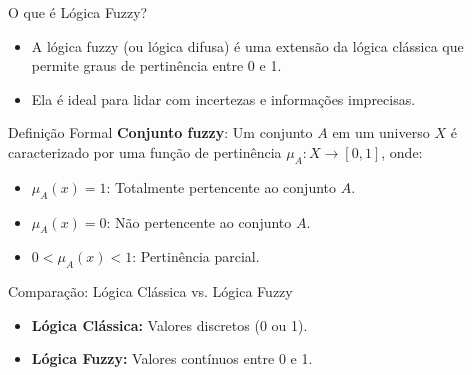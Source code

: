 \documentclass{beamer}
\begin{document}
\begin{frame}{O que é Lógica Fuzzy?}
    \begin{itemize}
        \item A lógica fuzzy (ou lógica difusa) é uma extensão da lógica clássica que permite graus de pertinência entre 0 e 1.
        \item Ela é ideal para lidar com incertezas e informações imprecisas.
    \end{itemize}
    \pause
    \begin{block}{Definição Formal}
        \textbf{Conjunto fuzzy}: Um conjunto \( A \) em um universo \( X \) é caracterizado por uma função de pertinência \( \mu_A: X \to [0, 1] \), onde:
        \begin{itemize}
            \item \( \mu_A(x) = 1 \): Totalmente pertencente ao conjunto \( A \).
            \item \( \mu_A(x) = 0 \): Não pertencente ao conjunto \( A \).
            \item \( 0 < \mu_A(x) < 1 \): Pertinência parcial.
        \end{itemize}
    \end{block}
\end{frame}

\begin{frame}{Comparação: Lógica Clássica vs. Lógica Fuzzy}
    \centering
    \vspace{0.5cm}
    \begin{itemize}
        \item \textbf{Lógica Clássica:} Valores discretos (0 ou 1).
        \item \textbf{Lógica Fuzzy:} Valores contínuos entre 0 e 1.
    \end{itemize}
\end{frame}
\end{document}
